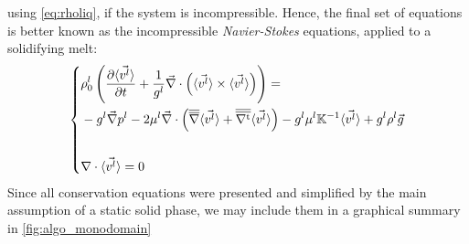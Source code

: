 using \cref{eq:rholiq}, if the system is incompressible. Hence, the final set of equations is better known as the incompressible \emph{Navier-Stokes} equations, applied to a solidifying melt:
\begin{equation}
\label{eq:Navier-Stokes2}
   \left\{
   \begin{aligned}
      & \rho_{0}^{l} \left( \frac{\partial  \langle \vec{v^l} \rangle }{\partial t}  + \frac{1}{{g^l}} \vec{\nabla} \cdot \left( \langle \vec{v^l} \rangle \times \langle \vec{v^l} \rangle \right) \right) = \\
	  &- {g^l}\vec{\nabla} {p^l} - 2 \mu^l \vec{\nabla} \cdot \left( {\overline{\overline{\nabla}}} \langle \vec{v^l} \rangle + {\overline{\overline{\nabla^\text{t}}}} \langle \vec{v^l} \rangle \right)
	  - {g^l} \mu^l \mathbb{K}^{-1} \langle \vec{v^l} \rangle + {g^l} \rho^l \vec{g}\\ \\
      & \nabla \cdot \langle \vec{v^l} \rangle =0
    \end{aligned}
    \right.
\end{equation}
Since all conservation equations were presented and simplified by the main assumption of a static solid phase, 
we may include them in a graphical summary in \cref{fig:algo_monodomain}
